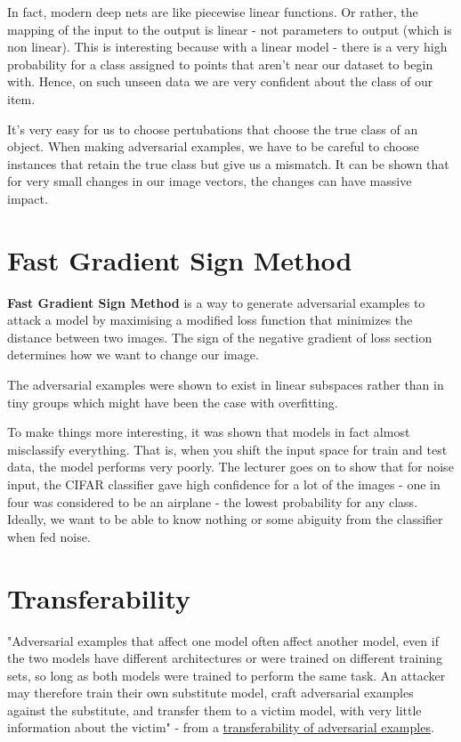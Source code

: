 In fact, modern deep nets are like piecewise linear functions. Or rather, the mapping of the input to the output is linear - not parameters to output (which is non linear). This is interesting because with a linear model - there is a very high probability for a class assigned to points that aren't near our dataset to begin with. Hence, on such unseen data we are very confident about the class of our item. 

It's very easy for us to choose pertubations that choose the true class of an object. When making adversarial examples, we have to be careful to choose instances that retain the true class but give us a mismatch. It can be shown that for very small changes in our image vectors, the changes can have massive impact. 

\section{Fast Gradient Sign Method}

\textbf{Fast Gradient Sign Method} is a way to generate adversarial examples to attack a model by maximising a modified loss function that minimizes the distance between two images. The sign of the negative gradient of loss section determines how we want to change our image.

The adversarial examples were shown to exist in linear subspaces rather than in tiny groups which might have been the case with overfitting.   

To make things more interesting, it was shown that models in fact almost misclassify everything. That is, when you shift the input space for train and test data, the model performs very poorly. The lecturer goes on to show that for noise input, the CIFAR classifier gave high confidence for a lot of the images - one in four was considered to be an airplane - the lowest probability for any class. Ideally, we want to be able to know nothing or some abiguity from the classifier when fed noise. 

\section{Transferability}

 "Adversarial examples that affect one model often affect another model, even if the two models have different architectures or were trained on different training sets, so long as both models were trained to perform the same task.  An attacker may therefore  train  their  own substitute model,  craft  adversarial examples against the substitute, and transfer them to a victim model, with very little information about the victim" - from a \href{https://arxiv.org/pdf/1605.07277.pdf}{transferability of adversarial examples}.
 
